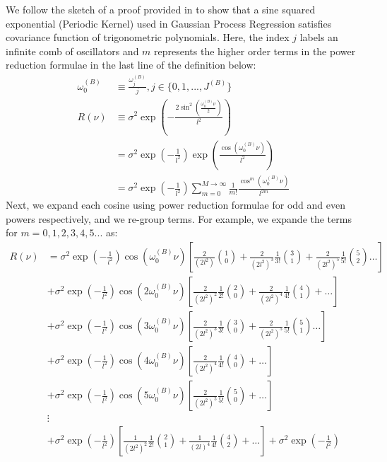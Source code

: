 We follow the sketch of a proof provided in \cite{solin2014explicit} to show that a sine squared exponential (Periodic Kernel) used in Gaussian Process Regression satisfies covariance function of trigonometric polynomials. Here, the index $j$ labels an infinite comb of oscillators and $m$ represents the higher order terms in the power reduction formulae in the last line of the definition below:
\begin{align}
\omega_0^{(B)}  &\equiv \frac{\omega_j^{(B)} }{j}, j \in \{0, 1,..., J^{(B)}\} \\
R(\nu) &\equiv \sigma^2 \exp (- \frac{2\sin^2(\frac{\omega_0^{(B)}  \nu}{2})}{l^2}) \\
&=  \sigma^2 \exp (- \frac{1}{l^2}) \exp (\frac{\cos(\omega_0^{(B)}  \nu)}{l^2}) \label{eqn:periodic_0}\\
&=  \sigma^2 \exp (- \frac{1}{l^2}) \sum_{m = 0}^{M  \to\infty} \frac{1}{m!} \frac{\cos^m(\omega_0^{(B)}  \nu)}{l^{2m}} \label{eqn:periodic_1}
\end{align}
Next, we expand each cosine using power reduction formulae for odd and even powers respectively, and we re-group terms. For example, we expande the terms for  $m = 0,1,2,3,4,5...$ as:
\begin{align}
R(\nu) &= \sigma^2 \exp (- \frac{1}{l^2}) \cos(\omega_0^{(B)}  \nu) \left[ \frac{2}{(2l^2)}\binom{1}{0} + \frac{2}{(2l^2)^3} \frac{1}{3!} \binom{3}{1} +  \frac{2}{(2l^2)^5} \frac{1}{5!}\binom{5}{2} \dots \right] \label{eqn:cosine1}\\
& + \sigma^2 \exp (- \frac{1}{l^2}) \cos(2\omega_0^{(B)}  \nu) \left[ \frac{2}{(2l^2)^2} \frac{1}{2!} \binom{2}{0} + \frac{2}{(2l^2)^4} \frac{1}{4!} \binom{4}{1} + \dots \right] \\
& + \sigma^2 \exp (- \frac{1}{l^2}) \cos(3\omega_0^{(B)}  \nu) \left[ \frac{2}{(2l^2)^3} \frac{1}{3!} \binom{3}{0} + \frac{2}{(2l^2)^5} \frac{1}{5!}\binom{5}{1} \dots \right] \\
& + \sigma^2 \exp (- \frac{1}{l^2}) \cos(4\omega_0^{(B)}  \nu) \left[ \frac{2}{(2l^2)^4} \frac{1}{4!} \binom{4}{0} + \dots \right] \\
& + \sigma^2 \exp (- \frac{1}{l^2}) \cos(5\omega_0^{(B)}  \nu) \left[ \frac{2}{(2l^2)^5} \frac{1}{5!}\binom{5}{0} + \dots \right] \label{eqn:cosine5}\\
& \vdots \nonumber \\
& + \sigma^2 \exp (- \frac{1}{l^2}) \left[ \frac{1}{(2l^2)^2} \frac{1}{2!} \binom{2}{1} + \frac{1}{(2l)^4} \frac{1}{4!} \binom{4}{2} + \dots \right] + \sigma^2 \exp (- \frac{1}{l^2}) \label{eqn:eventerms}
\end{align}
